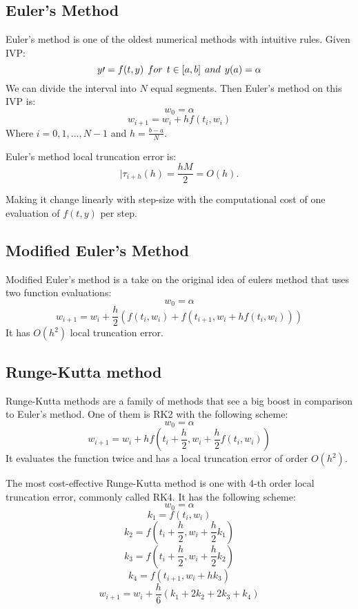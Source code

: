\documentclass[11pt]{article}	%
\begin{document}
\subsection{Euler's Method}
Euler's method is one of the oldest numerical methods with intuitive rules. Given IVP:
$$y\prime = f(t, y) \hspace{0.15cm} for \hspace{0.15cm} t \in [a, b] \hspace{0.15cm} and \hspace{0.15cm} y(a) = \alpha $$ 
We can divide the interval into $N$ equal segments. Then Euler's method on this IVP is: 
$$w_0 = \alpha $$
$$w_{i+1} = w_i + hf(t_i, w_i)$$
Where $i = 0,1,..., N-1$ and $h = \frac{b-a}{N}$. 

Euler's method local truncation error is: 
$$|\tau _{i+h}(h) = \frac{hM}{2} = O(h).$$

Making it change linearly with step-size with the computational cost of one evaluation of $f(t, y)$ per step. 

\subsection{Modified Euler's Method}
Modified Euler's method is a take on the original idea of eulers method that uses two function evaluations:
$$w_0 = \alpha $$
$$w_{i+1} = w_i + \frac{h}{2}(f(t_i,w_i) + f(t_{i+1}, w_i + hf(t_i,w_i)))$$
It has $O(h^2)$ local truncation error. 


\subsection{Runge-Kutta method}
Runge-Kutta methods are a family of methods that see a big boost in comparison to Euler's method. One of them is RK2 with the following scheme:
$$w_0 = \alpha $$
$$w_{i+1} = w_i + hf(t_i + \frac{h}{2}, w_i + \frac{h}{2}f(t_i, w_i))$$
It evaluates the function twice and has a local truncation error of order $O(h^2)$.

The most cost-effective Runge-Kutta method is one with 4-th order local truncation error, commonly called RK4. It has the following scheme:
$$w_0 = \alpha $$
$$k_1 = f(t_i, w_i)$$
$$k_2 = f(t_i + \frac{h}{2}, w_i + \frac{h}{2}k_1)$$
$$k_3 = f(t_i + \frac{h}{2}, w_i + \frac{h}{2}k_2)$$
$$k_4 = f(t_{i+1}, w_i + hk_3)$$
$$w_{i+1} = w_i + \frac{h}{6}(k_1 + 2k_2 + 2k_3 + k_4)$$
\end{document}
